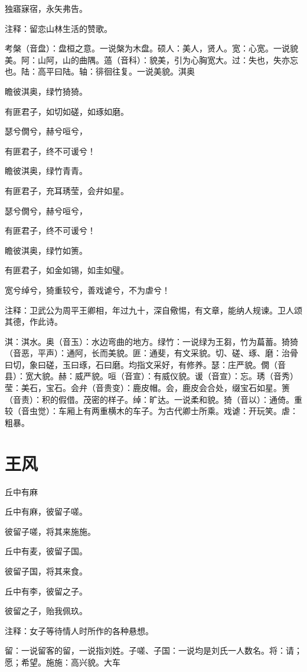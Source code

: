 \documentclass[12pt,UTF8]{ctexbook}
\begin{document}
独寤寐宿，永矢弗告。

注释：留恋山林生活的赞歌。

考槃（音盘）：盘桓之意。一说槃为木盘。硕人：美人，贤人。宽：心宽。一说貌美。阿：山阿，山的曲隅。薖（音科）：貌美，引为心胸宽大。过：失也，失亦忘也。陆：高平曰陆。轴：徘徊往复。一说美貌。淇奥

瞻彼淇奥，绿竹猗猗。

有匪君子，如切如磋，如琢如磨。

瑟兮僩兮，赫兮咺兮，

有匪君子，终不可谖兮！

瞻彼淇奥，绿竹青青。

有匪君子，充耳琇莹，会弁如星。

瑟兮僩兮，赫兮咺兮，

有匪君子，终不可谖兮！

瞻彼淇奥，绿竹如箦。

有匪君子，如金如锡，如圭如璧。

宽兮绰兮，猗重较兮，善戏谑兮，不为虐兮！

注释：卫武公为周平王卿相，年过九十，深自儆惕，有文章，能纳人规谏。卫人颂其德，作此诗。

淇：淇水。奥（音玉）：水边弯曲的地方。绿竹：一说绿为王芻，竹为萹蓄。猗猗（音恶，平声）：通阿，长而美貌。匪：通斐，有文采貌。切、磋、琢、磨：治骨曰切，象曰磋，玉曰琢，石曰磨。均指文采好，有修养。瑟：庄严貌。僩（音县）：宽大貌。赫：威严貌。咺（音宣）：有威仪貌。谖（音宣）：忘。琇（音秀）莹：美石，宝石。会弁（音贵变）：鹿皮帽。会，鹿皮会合处，缀宝石如星。箦（音责）：积的假借。茂密的样子。绰：旷达。一说柔和貌。猗（音以）：通倚。重较（音虫觉）：车厢上有两重横木的车子。为古代卿士所乘。戏谑：开玩笑。虐：粗暴。



\part{王风}

丘中有麻

丘中有麻，彼留子嗟。

彼留子嗟，将其来施施。

丘中有麦，彼留子国。

彼留子国，将其来食。

丘中有李，彼留之子。

彼留之子，贻我佩玖。

注释：女子等待情人时所作的各种悬想。

留：一说留客的留，一说指刘姓。子嗟、子国：一说均是刘氏一人数名。将：请；愿；希望。施施：高兴貌。大车
\end{document}
